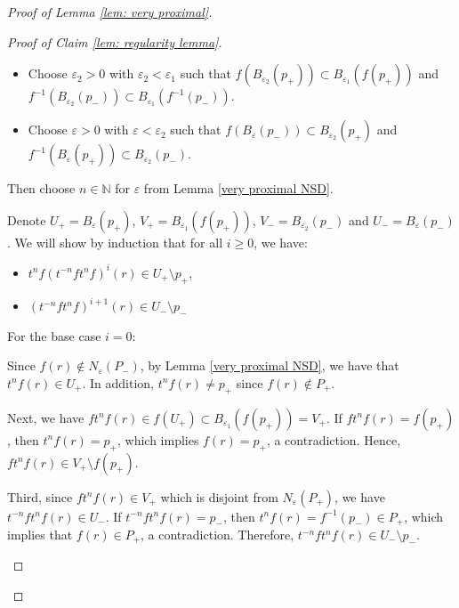 \documentclass[12pt]{article}
\theoremstyle{definition}
\newcommand{\N}{\mathbb{N}}
\newcommand{\ve}{\varepsilon}
\begin{document}
\begin{proof} [Proof of Lemma \ref{lem: very proximal}]
\begin{proof}[Proof of Claim \ref{lem: regularity lemma}]
\begin{enumerate}
\begin{enumerate}
\begin{enumerate}
\begin{itemize}
        
        
        We can furthermore decrease $\ve_1$ to ensure $B_{\ve_1}(f^{\pm 1}(p_\pm)) \cap B \subset \{f^{\pm 1}(p_\pm)\}$ and $B_{\ve_1}(p_\pm) \cap B \subset \{p_\pm\}$,
        \item Choose $\ve_2 > 0$ with $\ve_2 < \ve_1$ such that $f(B_{\ve_2}(p_+)) \subset B_{\ve_1}(f(p_+))$ and \newline $f^{-1}(B_{\ve_2}(p_-)) \subset B_{\ve_1}(f^{-1}(p_-))$.
        \item Choose $\ve > 0$ with $\ve < \ve_2$ such that $f(B_{\ve}(p_-)) \subset B_{\ve_2}(p_+)$ and $f^{-1}(B_{\ve}(p_+)) \subset B_{\ve_2}(p_-)$. 
    \end{itemize}

    Then choose $n \in \N$ for $\ve$ from Lemma \ref{very proximal NSD}. 
    
    Denote $U_+ = B_{\ve}(p_+)$, $V_+ = B_{\ve_1}(f(p_+))$, $V_- = B_{\ve_2}(p_-)$ and $U_- = B_{\ve}(p_-)$. We will show by induction that for all $i \geq 0$, we have: 

    \begin{itemize} 
        \item $t^n f(t^{-n}f t^n f)^i(r) \in U_+ \setminus p_+$,
        \item $(t^{-n}f t^n f)^{i+1}(r) \in U_- \setminus p_-$
    \end{itemize}

    For the base case $i = 0$:

    Since $f(r) \notin N_{\ve}(P_-)$, by Lemma \ref{very proximal NSD}, we have that $t^n f(r) \in U_+$. In addition, $t^n f(r) \neq p_+$ since $f(r) \notin P_+$. 

    Next, we have $ft^nf(r) \in f(U_+) \subset B_{\ve_1}(f(p_+)) = V_+$. If $ft^nf(r) = f(p_+)$, then $t^n f(r) = p_+$, which implies $f(r) = p_+$, a contradiction. Hence, $ft^nf(r) \in V_+ \setminus f(p_+)$. 
    
    Third, since $ft^nf(r) \in V_+$ which is disjoint from $N_{\ve}(P_+)$, we have $t^{-n} ft^nf(r) \in U_-$. If $t^{-n} ft^nf(r) = p_-$, then $t^n f(r) = f^{-1}(p_-) \in P_+$, which implies that $f(r) \in P_+$, a contradiction. Therefore, $t^{-n} ft^nf(r) \in U_- \setminus p_-$.



\end{enumerate}
\end{enumerate}
\end{enumerate}
\end{proof}
\end{proof}
\end{document}
